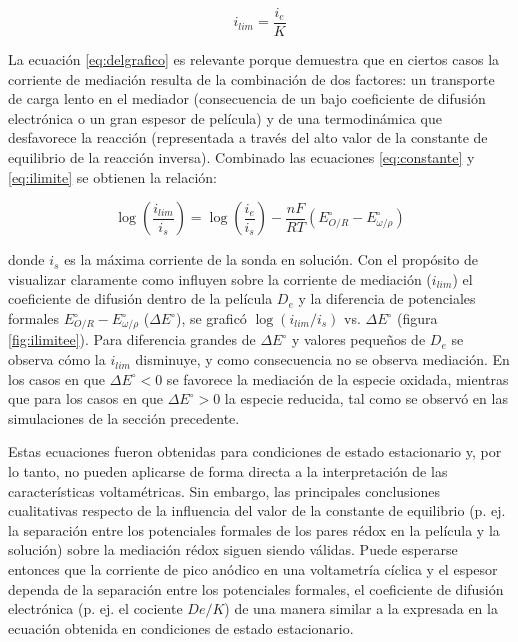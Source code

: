 		\begin{equation}
		i_{lim}=\frac{i_e}{K}
		\label{eq:ilimite}
		\end{equation}

		La ecuación \ref{eq:delgrafico} es relevante porque demuestra que en ciertos casos la corriente de mediación resulta de la combinación de dos factores: un transporte de carga lento en el mediador (consecuencia de un bajo coeficiente de difusión electrónica o un gran espesor de película) y de una termodinámica que desfavorece la reacción (representada a través del alto valor de la constante de equilibrio de la reacción inversa).\cite{ybarra2005}
		Combinado las ecuaciones \ref{eq:constante} y \ref{eq:ilimite} se obtienen la relación:

		\begin{equation}
			\log\left({\frac{i_{lim}}{i_s}}\right) =\log\left({\frac{i_e}{i_s}}\right)-{\frac{nF}{RT}}\left( E^{\circ}_{O/R} - E^{\circ}_{\omega / \rho} \right)
			\label{eq:delgrafico}
		\end{equation}

		\noindent donde $i_s$ es la máxima corriente de la sonda en solución. Con el propósito de visualizar claramente como influyen sobre la corriente de mediación ($i_{lim}$) el coeficiente de difusión dentro de la película $D_e$ y la diferencia de potenciales formales $E^{\circ}_{O/R} - E^{\circ}_{\omega / \rho}$ ($\Delta E^{\circ}$), se graficó $\log(i_{lim}/i_{s})$ vs. $\Delta E^{\circ}$ (figura \ref{fig:ilimitee}). Para diferencia grandes de $\Delta E^{\circ}$ y valores pequeños de $D_e$  se observa cómo la $i_{lim}$ disminuye, y como consecuencia no se observa mediación. En los casos en que $\Delta E^{\circ}<0$ se favorece la mediación de la especie oxidada, mientras que para los casos en que $\Delta E^{\circ}>0$ la especie reducida, tal como se observó en las simulaciones de la sección precedente.\cite{ybarra2007}

		Estas ecuaciones fueron obtenidas para condiciones de estado estacionario y, por lo tanto, no pueden aplicarse de forma directa a la interpretación de las características voltamétricas. Sin embargo, las principales conclusiones cualitativas respecto de la influencia del valor de la constante de equilibrio (p. ej. la separación entre los potenciales formales de los pares rédox en la película y la solución) sobre la mediación rédox siguen siendo válidas. Puede esperarse entonces que la corriente de pico anódico en una voltametría cíclica y el espesor dependa de la separación entre los potenciales formales, el coeficiente de difusión electrónica (p. ej. el cociente $De/K$) de una manera similar a la expresada en la ecuación obtenida en condiciones de estado estacionario. 
		
